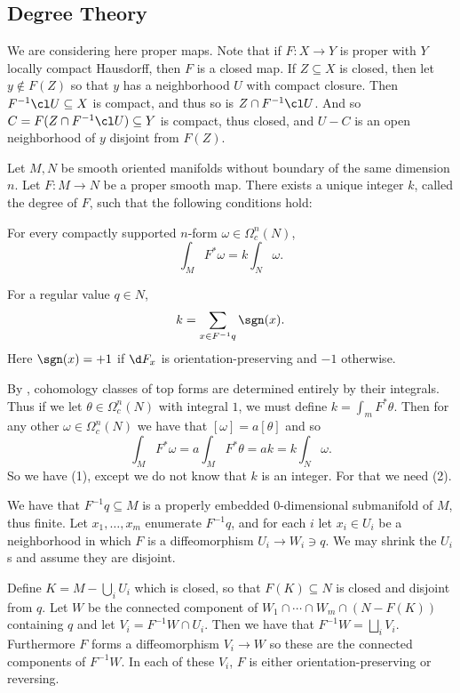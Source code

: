 \subsection{Degree Theory}

We are considering here proper maps.
Note that if $F\colon X\to Y$ is proper with $Y$ locally compact Hausdorff, then $F$ is a closed map.
If $Z\subseteq X$ is closed, then let $y\notin F(Z)$ so that $y$ has a neighborhood $U$ with compact closure.
Then $F^{-1}\cl U\subseteq X$ is compact, and thus so is $Z\cap F^{-1}\cl U$.
And so $C=F(Z\cap F^{-1}\cl U)\subseteq Y$ is compact, thus closed, and $U-C$ is an open neighborhood of $y$ disjoint from
$F(Z)$.

\bthrm

    Let $M,N$ be smooth oriented manifolds without boundary of the same dimension $n$.
    Let $F\colon M\to N$ be a proper smooth map.
    There exists a unique integer $k$, called the {\emphcolor degree} of $F$, such that the following conditions hold:
    \benum
        \item For every compactly supported $n$-form $\omega\in\Omega^n_c(N)$,
        $$ \int_MF^*\omega = k\int_N\omega . $$
        \item For a regular value $q\in N$,
        $$ k = \sum_{x\in F^{-1}q}\sgn(x) . $$
        Here $\sgn(x)=+1$ if $\d F_x$ is orientation-preserving and $-1$ otherwise.
    \eenum

\ethrm

\bproof

    By , cohomology classes of top forms are determined entirely by their integrals.
    Thus if we let $\theta\in\Omega^n_c(N)$ with integral $1$, we must define $k=\int_mF^*\theta$.
    Then for any other $\omega\in\Omega^n_c(N)$ we have that $[\omega]=a[\theta]$ and so
    $$ \int_MF^*\omega = a\int_MF^*\theta = ak = k\int_N\omega . $$
    So we have (1), except we do not know that $k$ is an integer.
    For that we need (2).

    We have that $F^{-1}q\subseteq M$ is a properly embedded $0$-dimensional submanifold of $M$, thus finite.
    Let $x_1,\dots,x_m$ enumerate $F^{-1}q$, and for each $i$ let $x_i\in U_i$ be a neighborhood in which $F$ is a
    diffeomorphism $U_i\to W_i\ni q$.
    We may shrink the $U_i$s and assume they are disjoint.

    Define $K=M-\bigcup_iU_i$ which is closed, so that $F(K)\subseteq N$ is closed and disjoint from $q$.
    Let $W$ be the connected component of $W_1\cap\cdots\cap W_m\cap(N-F(K))$ containing $q$ and let
    $V_i=F^{-1}W\cap U_i$.
    Then we have that $F^{-1}W=\bigsqcup_iV_i$.
    Furthermore $F$ forms a diffeomorphism $V_i\to W$ so these are the connected components of $F^{-1}W$.
    In each of these $V_i$, $F$ is either orientation-preserving or reversing.

